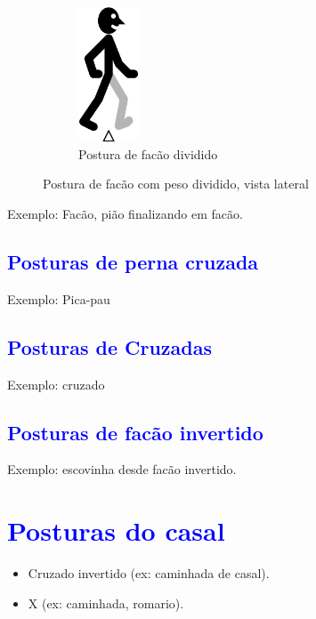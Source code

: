 \begin{figure}[H]
    \centering
    \begin{subfigure}[b]{0.3\textwidth}
        \includegraphics[height=4cm]{chapters/cap-posturas/postura-facao-dividido-esq.eps}
        \caption{Postura de facão dividido}
        \label{fig:facaodivididoesq}
    \end{subfigure}
    \caption{Postura de facão com peso dividido, vista lateral}\label{fig:facaodividido}
\end{figure}

Exemplo: Facão, pião finalizando em facão.

\subsection{\textcolor{blue}{ Posturas de perna cruzada }}
Exemplo: Pica-pau


\subsection{\textcolor{blue}{ Posturas de Cruzadas }}
Exemplo: cruzado

\subsection{\textcolor{blue}{ Posturas de facão invertido}}

Exemplo: escovinha desde facão invertido.


\section{\textcolor{blue}{Posturas do casal}}

\begin{itemize}
\item Cruzado invertido (ex: caminhada de casal).
\item X (ex: caminhada, romario).
\end{itemize}
